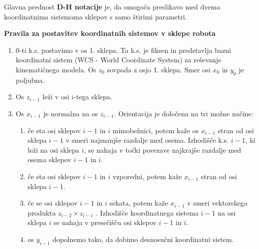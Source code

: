 Glavna prednost \textbf{D-H notacije} je, da omogoča preslikavo med dvema koordinatnima sistemoma sklepov s samo štirimi
parametri.

\begin{mdframed}[backgroundcolor=green!20, shadow=false,roundcorner=12pt,topline
=false, rightline=false,bottomline=false,leftline=false]
\vspace{-0.35cm}

\vspace{4mm} \noindent \textbf{Pravila za postavitev koordinatnih
sistemov v sklepe robota}

\begin{enumerate}
\item\vspace*{-0.35cm} $0$-ti k.s. postavimo v os 1. sklepa. Ta k.s.
je fiksen in predstavlja bazni koordinatni sistem (WCS - World Coordinate
System) za reševanje kinematičnega modela. Os $z_0$ sovpada z osjo 1. sklepa.
Smer osi $x_0$ in $y_0$ je poljubna.

\item\vspace*{-0.35cm} Os $z_{i-1}$ leži v osi $i$-tega sklepa.


\item\vspace*{-0.35cm} Os $x_{i-1}$ je normalna na os $z_{i-1}$.
Orientacija je določena na tri možne načine:

\begin{enumerate}
\item\vspace*{-0.1cm} če sta osi sklepov $i-1$ in $i$ mimobežnici,
potem kaže os $x_{i-1}$ stran od osi sklepa $i-1$ v smeri najmanjše razdalje
med osema. Izhodišče k.s. $i-1$, ki leži na osi sklepa $i$, se nahaja v točki
povezave najkrajše razdalje med osema sklepov $i-1$ in $i$.

\item\vspace*{-0.1cm} če sta osi sklepov $i-1$ in $i$ vzporedni,
potem kaže $x_{i-1}$ stran od osi sklepa $i-1$.

\item\vspace*{-0.1cm} če se osi sklepov $i-1$ in $i$ sekata, potem
kaže $x_{i-1}$ v smeri vektorskega produkta \newline $z_{i-2}\times z_{i-1}$ .
Izhodišče koordinatnega sistema $i-1$ na osi sklepa $i$ se nahaja v presečišču
osi sklepov $i-1$ in $i$.

\item\vspace*{-0.1cm} os $y_{i-1}$ dopolnemo tako, da dobimo
desnosučni koordinatni sistem.
\end{enumerate}
\end{enumerate}

\end{mdframed}

